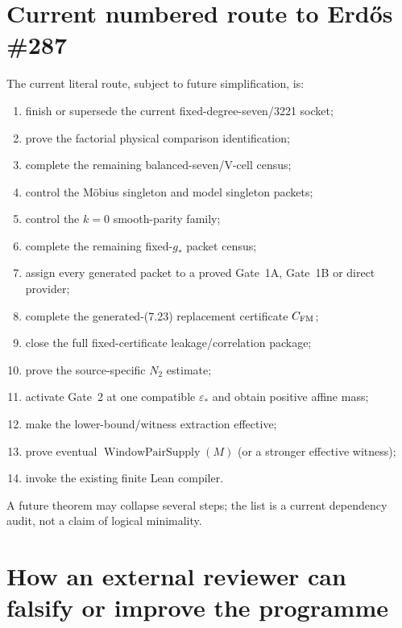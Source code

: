 \documentclass[11pt]{article}
\theoremstyle{definition}
\newcommand{\1}{\mathbf 1}
\newcommand{\WPS}{\operatorname{WindowPairSupply}}
\begin{document}
{{{\section{Current numbered route to Erd\H{o}s \#287}
\label{sec:numbered-route}

The current literal route, subject to future simplification, is:
\begin{enumerate}[leftmargin=2.1em]
\item finish or supersede the current fixed-degree-seven/3221 socket;
\item prove the factorial physical comparison identification;
\item complete the remaining balanced-seven/V-cell census;
\item control the M\"obius singleton and model singleton packets;
\item control the $k=0$ smooth-parity family;
\item complete the remaining fixed-$g_\ast$ packet census;
\item assign every generated packet to a proved Gate~1A, Gate~1B or direct provider;
\item complete the generated-(7.23) replacement certificate $C_{\rm FM}$;
\item close the full fixed-certificate leakage/correlation package;
\item prove the source-specific $N_2$ estimate;
\item activate Gate~2 at one compatible $\varepsilon_\ast$ and obtain positive affine mass;
\item make the lower-bound/witness extraction effective;
\item prove eventual $\WPS(M)$ (or a stronger effective witness);
\item invoke the existing finite Lean compiler.
\end{enumerate}
A future theorem may collapse several steps; the list is a current dependency audit, not a
claim of logical minimality.

\section{How an external reviewer can falsify or improve the programme}
\label{sec:review-invitation}

}}}
\end{document}
